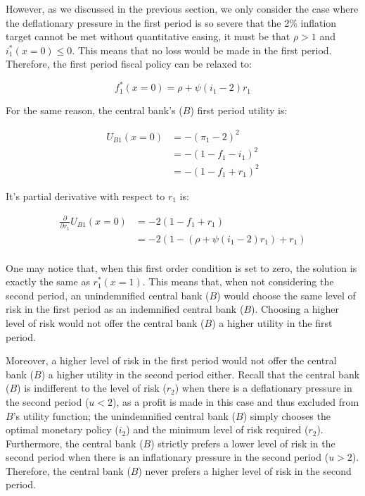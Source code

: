 \documentclass[
  a4paper,
  abstract=true]{scrartcl}
\theoremstyle{definition}
\begin{document}
However, as we discussed in the previous section, we only consider the
case where the deflationary pressure in the first period is so severe
that the 2\% inflation target cannot be met without quantitative easing,
it must be that \(\rho>1\) and \(i^*_1(x=0)\leq0\). This means that no
loss would be made in the first period. Therefore, the first period
fiscal policy can be relaxed to:

\[
f_1^*(x=0)=\rho +\psi(i_1-2)r_1
\]

For the same reason, the central bank's (\(B\)) first period utility is:

\begin{align*}
U_{B1}(x=0)&=-(\pi_1-2)^2 \\
&=-(1-f_1-i_1)^2 \\
&=-(1-f_1+r_1)^2
\end{align*}

It's partial derivative with respect to \(r_1\) is:

\begin{align*}
\frac{\partial}{\partial r_1}U_{B1}(x=0)&=-2(1-f_1+r_1) \\
&=-2(1-(\rho +\psi(i_1-2)r_1)+r_1)\\
\end{align*}

One may notice that, when this first order condition is set to zero, the
solution is exactly the same as \(r^*_1(x=1)\). This means that, when
not considering the second period, an unindemnified central bank (\(B\))
would choose the same level of risk in the first period as an
indemnified central bank (\(B\)). Choosing a higher level of risk would
not offer the central bank (\(B\)) a higher utility in the first period.

Moreover, a higher level of risk in the first period would not offer the
central bank (\(B\)) a higher utility in the second period either.
Recall that the central bank (\(B\)) is indifferent to the level of risk
(\(r_2\)) when there is a deflationary pressure in the second period
(\(u<2\)), as a profit is made in this case and thus excluded from
\(B\)'s utility function; the unindemnified central bank (\(B\)) simply
chooses the optimal monetary policy (\(i_2\)) and the minimum level of
risk required (\(r_2\)). Furthermore, the central bank (\(B\)) strictly
prefers a lower level of risk in the second period when there is an
inflationary pressure in the second period (\(u>2\)). Therefore, the
central bank (\(B\)) never prefers a higher level of risk in the second
period.
\end{document}
